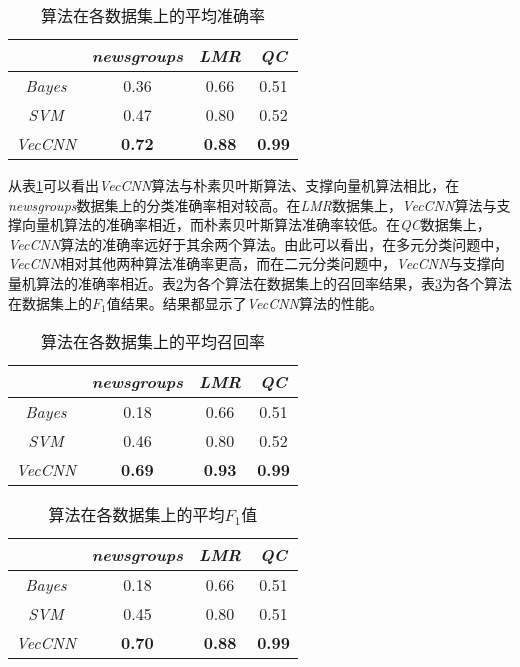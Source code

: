 \begin{table}[!ht]
    \centering
    \caption{算法在各数据集上的平均准确率}\label{tab:avgPrecision}
    \begin{tabular}{cccc}
        \hline
         & \textit{newsgroups} & \textit{LMR} & \textit{QC} \\
        \hline
        \textit{Bayes} & 0.36 & 0.66 & 0.51\\
        \hline
        \textit{SVM} & 0.47 & 0.80 & 0.52\\
        \hline
        \textit{VecCNN} & \textbf{0.72} & \textbf{0.88} & \textbf{0.99}\\
        \hline
    \end{tabular}
\end{table}

从表\ref{tab:avgPrecision}可以看出\textit{VecCNN}算法与朴素贝叶斯算法、支撑向量机算法相比，在\textit{newsgroups}数据集上的分类准确率相对较高。在\textit{LMR}数据集上，\textit{VecCNN}算法与支撑向量机算法的准确率相近，而朴素贝叶斯算法准确率较低。在\textit{QC}数据集上，\textit{VecCNN}算法的准确率远好于其余两个算法。由此可以看出，在多元分类问题中，\textit{VecCNN}相对其他两种算法准确率更高，而在二元分类问题中，\textit{VecCNN}与支撑向量机算法的准确率相近。表\ref{tab:avgRecall}为各个算法在数据集上的召回率结果，表\ref{tab:avgF1}为各个算法在数据集上的$F_1$值结果。结果都显示了\textit{VecCNN}算法的性能。

\begin{table}[!ht]
    \centering
    \caption{算法在各数据集上的平均召回率}\label{tab:avgRecall}
    \begin{tabular}{cccc}
        \hline
         & \textit{newsgroups} & \textit{LMR} & \textit{QC} \\
        \hline
        \textit{Bayes} & 0.18 & 0.66 & 0.51\\
        \hline
        \textit{SVM} & 0.46 & 0.80 & 0.52\\
        \hline
        \textit{VecCNN} & \textbf{0.69} & \textbf{0.93} & \textbf{0.99}\\
        \hline
    \end{tabular}
\end{table}

\begin{table}[!ht]
    \centering
    \caption{算法在各数据集上的平均$F_1$值}\label{tab:avgF1}
    \begin{tabular}{cccc}
        \hline
         & \textit{newsgroups} & \textit{LMR} & \textit{QC} \\
        \hline
        \textit{Bayes} & 0.18 & 0.66 & 0.51\\
        \hline
        \textit{SVM} & 0.45 & 0.80 & 0.51\\
        \hline
        \textit{VecCNN} & \textbf{0.70} & \textbf{0.88} & \textbf{0.99}\\
        \hline
    \end{tabular}
\end{table}

